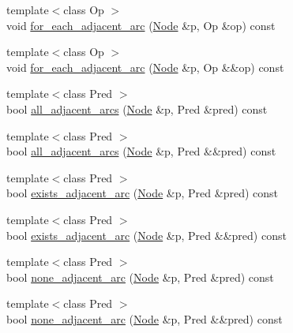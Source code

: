 \begin{DoxyCompactItemize}
\item 
{\footnotesize template$<$class Op $>$ }\\void \hyperlink{class_designar_1_1_base_graph_a5e35c97bdf055f67e744f7d961ccb6a9}{for\+\_\+each\+\_\+adjacent\+\_\+arc} (\hyperlink{namespace_designar_a5af326c65aa2bd26b26c410f2030d09e}{Node} \&p, Op \&op) const
\item 
{\footnotesize template$<$class Op $>$ }\\void \hyperlink{class_designar_1_1_base_graph_a21553c1d96334e4cf2e0e2086e0efeba}{for\+\_\+each\+\_\+adjacent\+\_\+arc} (\hyperlink{namespace_designar_a5af326c65aa2bd26b26c410f2030d09e}{Node} \&p, Op \&\&op) const
\item 
{\footnotesize template$<$class Pred $>$ }\\bool \hyperlink{class_designar_1_1_base_graph_af7a57a1088105a79466546620bf830b3}{all\+\_\+adjacent\+\_\+arcs} (\hyperlink{namespace_designar_a5af326c65aa2bd26b26c410f2030d09e}{Node} \&p, Pred \&pred) const
\item 
{\footnotesize template$<$class Pred $>$ }\\bool \hyperlink{class_designar_1_1_base_graph_aaae4400215b8ea6b55941875981c3892}{all\+\_\+adjacent\+\_\+arcs} (\hyperlink{namespace_designar_a5af326c65aa2bd26b26c410f2030d09e}{Node} \&p, Pred \&\&pred) const
\item 
{\footnotesize template$<$class Pred $>$ }\\bool \hyperlink{class_designar_1_1_base_graph_a5208fcd131d919271e1d54f6e45ab3e9}{exists\+\_\+adjacent\+\_\+arc} (\hyperlink{namespace_designar_a5af326c65aa2bd26b26c410f2030d09e}{Node} \&p, Pred \&pred) const
\item 
{\footnotesize template$<$class Pred $>$ }\\bool \hyperlink{class_designar_1_1_base_graph_a16d3fbb089265c1dc8da8ffbe2fb1434}{exists\+\_\+adjacent\+\_\+arc} (\hyperlink{namespace_designar_a5af326c65aa2bd26b26c410f2030d09e}{Node} \&p, Pred \&\&pred) const
\item 
{\footnotesize template$<$class Pred $>$ }\\bool \hyperlink{class_designar_1_1_base_graph_acf4b230e0d981f36770722011c96206f}{none\+\_\+adjacent\+\_\+arc} (\hyperlink{namespace_designar_a5af326c65aa2bd26b26c410f2030d09e}{Node} \&p, Pred \&pred) const
\item 
{\footnotesize template$<$class Pred $>$ }\\bool \hyperlink{class_designar_1_1_base_graph_adbacdf829cb2f21aff498bac9c9a8b8b}{none\+\_\+adjacent\+\_\+arc} (\hyperlink{namespace_designar_a5af326c65aa2bd26b26c410f2030d09e}{Node} \&p, Pred \&\&pred) const

\end{DoxyCompactItemize}
